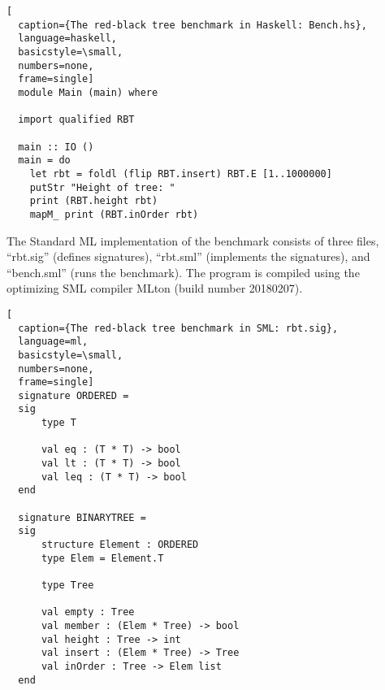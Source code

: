 \begin{lstlisting}[
  caption={The red-black tree benchmark in Haskell: Bench.hs},
  language=haskell,
  basicstyle=\small,
  numbers=none,
  frame=single]
  module Main (main) where

  import qualified RBT

  main :: IO ()
  main = do
    let rbt = foldl (flip RBT.insert) RBT.E [1..1000000]
    putStr "Height of tree: "
    print (RBT.height rbt)
    mapM_ print (RBT.inOrder rbt)
\end{lstlisting}

\newpage
The Standard ML implementation of the benchmark consists of three files, ``rbt.sig'' (defines signatures),
``rbt.sml'' (implements the signatures), and ``bench.sml'' (runs the benchmark). The program is
compiled using the optimizing SML compiler MLton (build number 20180207).

\begin{lstlisting}[
  caption={The red-black tree benchmark in SML: rbt.sig},
  language=ml,
  basicstyle=\small,
  numbers=none,
  frame=single]
  signature ORDERED =
  sig
      type T
             
      val eq : (T * T) -> bool
      val lt : (T * T) -> bool
      val leq : (T * T) -> bool
  end

  signature BINARYTREE =
  sig
      structure Element : ORDERED
      type Elem = Element.T
                         
      type Tree

      val empty : Tree
      val member : (Elem * Tree) -> bool
      val height : Tree -> int
      val insert : (Elem * Tree) -> Tree
      val inOrder : Tree -> Elem list
  end

\end{lstlisting}

